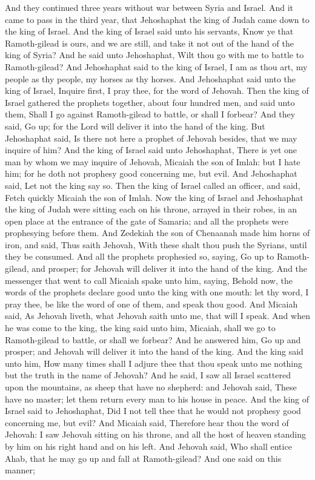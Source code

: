 And they continued three years without war between Syria and Israel. And it came to pass in the third year, that Jehoshaphat the king of Judah came down to the king of Israel. And the king of Israel said unto his servants, Know ye that Ramoth-gilead is ours, and we are still, and take it not out of the hand of the king of Syria? And he said unto Jehoshaphat, Wilt thou go with me to battle to Ramoth-gilead? And Jehoshaphat said to the king of Israel, I am as thou art, my people as thy people, my horses as thy horses.  And Jehoshaphat said unto the king of Israel, Inquire first, I pray thee, for the word of Jehovah. Then the king of Israel gathered the prophets together, about four hundred men, and said unto them, Shall I go against Ramoth-gilead to battle, or shall I forbear? And they said, Go up; for the Lord will deliver it into the hand of the king. But Jehoshaphat said, Is there not here a prophet of Jehovah besides, that we may inquire of him? And the king of Israel said unto Jehoshaphat, There is yet one man by whom we may inquire of Jehovah, Micaiah the son of Imlah: but I hate him; for he doth not prophesy good concerning me, but evil. And Jehoshaphat said, Let not the king say so. Then the king of Israel called an officer, and said, Fetch quickly Micaiah the son of Imlah. Now the king of Israel and Jehoshaphat the king of Judah were sitting each on his throne, arrayed in their robes, in an open place at the entrance of the gate of Samaria; and all the prophets were prophesying before them. And Zedekiah the son of Chenaanah made him horns of iron, and said, Thus saith Jehovah, With these shalt thou push the Syrians, until they be consumed. And all the prophets prophesied so, saying, Go up to Ramoth-gilead, and prosper; for Jehovah will deliver it into the hand of the king.  And the messenger that went to call Micaiah spake unto him, saying, Behold now, the words of the prophets declare good unto the king with one mouth: let thy word, I pray thee, be like the word of one of them, and speak thou good. And Micaiah said, As Jehovah liveth, what Jehovah saith unto me, that will I speak. And when he was come to the king, the king said unto him, Micaiah, shall we go to Ramoth-gilead to battle, or shall we forbear? And he answered him, Go up and prosper; and Jehovah will deliver it into the hand of the king. And the king said unto him, How many times shall I adjure thee that thou speak unto me nothing but the truth in the name of Jehovah? And he said, I saw all Israel scattered upon the mountains, as sheep that have no shepherd: and Jehovah said, These have no master; let them return every man to his house in peace. And the king of Israel said to Jehoshaphat, Did I not tell thee that he would not prophesy good concerning me, but evil? And Micaiah said, Therefore hear thou the word of Jehovah: I saw Jehovah sitting on his throne, and all the host of heaven standing by him on his right hand and on his left. And Jehovah said, Who shall entice Ahab, that he may go up and fall at Ramoth-gilead? And one said on this manner; 